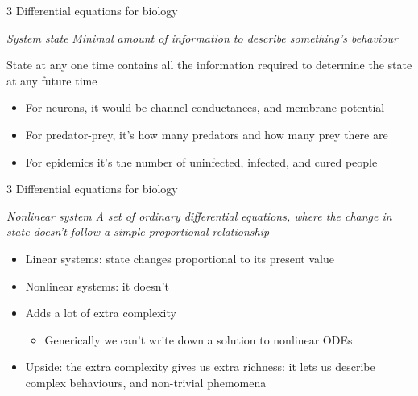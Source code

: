 \documentclass[presentation]{beamer}
\begin{document}
\begin{frame}[label={sec:org6e7f0a9}]{3 Differential equations for biology}
\begin{block}{\emph{System state}}
\emph{Minimal amount of information to describe something's behaviour}
\end{block}

\begin{block}{}
State at any one time contains all the information required to determine the state at any future time

\begin{itemize}
\item For neurons, it would be channel conductances, and membrane potential
\item For predator-prey, it's how many predators and how many prey there are
\item For epidemics it's the number of uninfected, infected, and cured people
\end{itemize}
\end{block}
\end{frame}

\begin{frame}[label={sec:org0b0a59d}]{3 Differential equations for biology}
\begin{block}{\emph{Nonlinear system}}
\emph{A set of ordinary differential equations, where the change in state doesn't follow a simple proportional relationship}
\end{block}

\begin{block}{}
\begin{itemize}
\item Linear systems: state changes proportional to its present value
\item Nonlinear systems: it doesn't
\item Adds a lot of extra complexity
\begin{itemize}
\item Generically we can't write down a solution to nonlinear ODEs
\end{itemize}
\item Upside: the extra complexity gives us extra richness: it lets us describe complex behaviours, and non-trivial phemomena
\end{itemize}
\end{block}
\end{frame}
\end{document}
